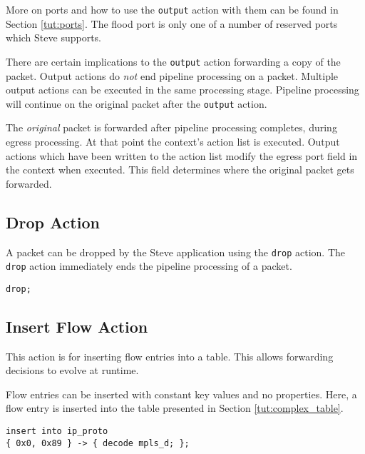 More on ports and how to use the \texttt{output} action with them can
be found in Section \ref{tut:ports}. The flood port is only one
of a number of reserved ports which Steve supports.

There are certain implications to the \texttt{output} action forwarding a copy of the packet. 
Output actions do \emph{not} end pipeline processing on a packet.
Multiple output actions can be executed in the same processing stage. 
Pipeline processing will continue
on the original packet after the \texttt{output} action.

The \textit{original} packet is forwarded after pipeline processing completes,
during egress processing.
At that point the context's action list is executed.
Output actions which have been written to the action list modify the
egress port field in the context when executed.
This field determines where the original packet gets forwarded.

\subsection{Drop Action} \label{tut:drop_action}

A packet can be dropped by the Steve application using the \texttt{drop} action.
The \texttt{drop} action immediately ends the pipeline processing of a packet.

\begin{codepage}
\begin{lstlisting}
drop;
\end{lstlisting}
\end{codepage}

\subsection{Insert Flow Action} \label{tut:insert_flow_action}

This action is for inserting flow entries into a table.
This allows forwarding decisions to evolve at runtime.

Flow entries can be inserted with constant key values and no properties. Here,
a flow entry is inserted into the table presented in Section
\ref{tut:complex_table}.

\begin{codepage}
\begin{lstlisting}
insert into ip_proto
{ 0x0, 0x89 } -> { decode mpls_d; };
\end{lstlisting}
\end{codepage}

